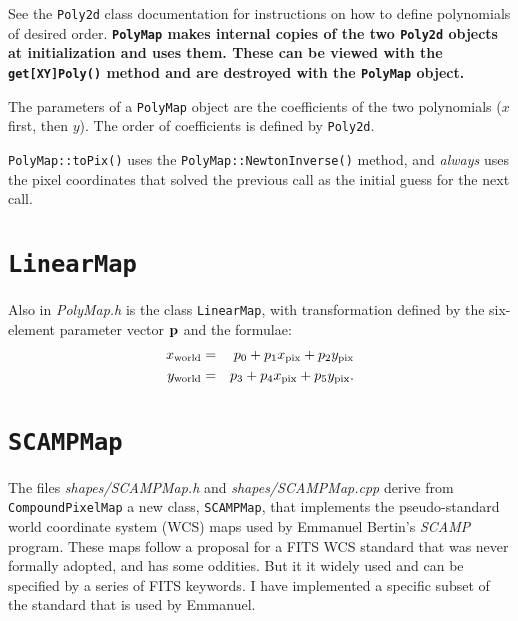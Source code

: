 \documentclass[11pt,preprint,flushrt]{aastex}
\begin{document}
See the {\tt Poly2d} class documentation for instructions on how to define polynomials of desired order.  {\bf {\tt PolyMap} makes internal copies of the two {\tt Poly2d} objects at initialization and uses them.  These can be viewed with the {\tt get[XY]Poly()} method and are destroyed with the {\tt PolyMap} object.}  

The parameters of a {\tt PolyMap} object are the coefficients of the two polynomials ($x$ first, then $y$).  The order of coefficients is defined by {\tt Poly2d}.

{\tt PolyMap::toPix()} uses the {\tt PolyMap::NewtonInverse()} method, and {\em always} uses the pixel coordinates that solved the previous call as the initial guess for the next call.
\section{{\tt LinearMap}}
Also in {\it PolyMap.h} is the class {\tt LinearMap}, with transformation defined by the six-element parameter vector ${\bf p}$ and the formulae:
\begin{eqnarray}
x_{\rm world} & = & p_0 + p_1 x_{\rm pix} + p_2 y_{\rm pix} \\
y_{\rm world} & = & p_3 + p_4 x_{\rm pix} + p_5 y_{\rm pix}.
\end{eqnarray}

\section{{\tt SCAMPMap}}
The files {\it shapes/SCAMPMap.h} and {\it shapes/SCAMPMap.cpp} derive from {\tt CompoundPixelMap} a new class, {\tt SCAMPMap}, that implements the pseudo-standard world coordinate system (WCS) maps used by Emmanuel Bertin's {\it SCAMP} program.  These maps follow a proposal for a FITS WCS standard that was never formally adopted, and has some oddities.  But it it widely used and can be specified by a series of FITS keywords.  I have implemented a specific subset of the standard that is used by Emmanuel.
\end{document}
